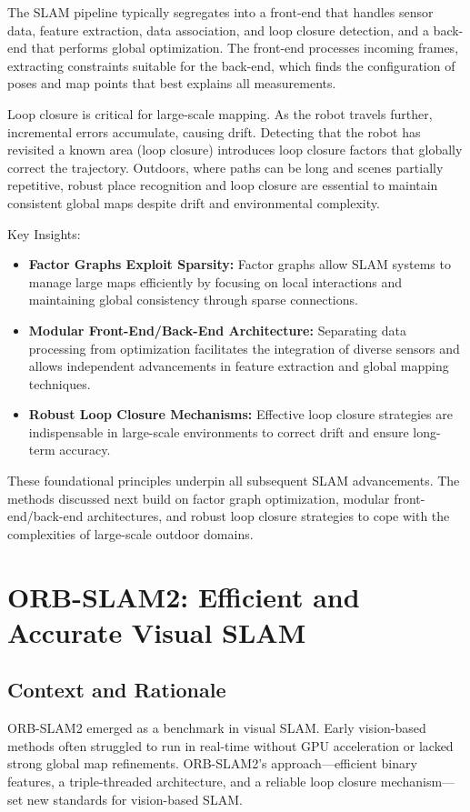 \documentclass[conference]{IEEEtran}
\begin{document}
The SLAM pipeline typically segregates into a front-end that handles sensor data, feature extraction, data association, and loop closure detection, and a back-end that performs global optimization. The front-end processes incoming frames, extracting constraints suitable for the back-end, which finds the configuration of poses and map points that best explains all measurements.

Loop closure is critical for large-scale mapping. As the robot travels further, incremental errors accumulate, causing drift. Detecting that the robot has revisited a known area (loop closure) introduces loop closure factors that globally correct the trajectory. Outdoors, where paths can be long and scenes partially repetitive, robust place recognition and loop closure are essential to maintain consistent global maps despite drift and environmental complexity.

Key Insights:

\begin{itemize}
    \item \textbf{Factor Graphs Exploit Sparsity:} Factor graphs allow SLAM systems to manage large maps efficiently by focusing on local interactions and maintaining global consistency through sparse connections.
    \item \textbf{Modular Front-End/Back-End Architecture:} Separating data processing from optimization facilitates the integration of diverse sensors and allows independent advancements in feature extraction and global mapping techniques.
    \item \textbf{Robust Loop Closure Mechanisms:} Effective loop closure strategies are indispensable in large-scale environments to correct drift and ensure long-term accuracy.
\end{itemize}

These foundational principles underpin all subsequent SLAM advancements. The methods discussed next build on factor graph optimization, modular front-end/back-end architectures, and robust loop closure strategies to cope with the complexities of large-scale outdoor domains.

\section{ORB-SLAM2: Efficient and Accurate Visual SLAM}
\subsection{Context and Rationale}
ORB-SLAM2 \cite{1} emerged as a benchmark in visual SLAM. Early vision-based methods often struggled to run in real-time without GPU acceleration or lacked strong global map refinements. ORB-SLAM2’s approach—efficient binary features, a triple-threaded architecture, and a reliable loop closure mechanism—set new standards for vision-based SLAM.
\end{document}
